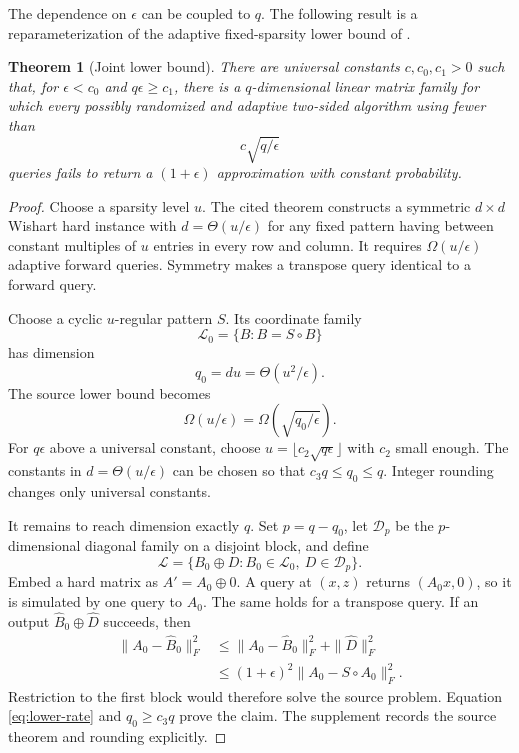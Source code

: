 \documentclass[twoside]{article}
\newtheorem{theorem}{Theorem}
\newcommand{\cL}{\mathcal L}
\begin{document}
The dependence on $\epsilon$ can be coupled to $q$. The following result is a reparameterization of the adaptive fixed-sparsity lower bound of \citet{amsel2026fixed}.

\begin{theorem}[Joint lower bound]
\label{thm:lower}
There are universal constants $c,c_0,c_1>0$ such that, for $\epsilon<c_0$ and $q\epsilon\ge c_1$, there is a $q$-dimensional linear matrix family for which every possibly randomized and adaptive two-sided algorithm using fewer than \[ c\sqrt{q/\epsilon} \] queries fails to return a $(1+\epsilon)$ approximation with constant probability.
\end{theorem}

\begin{proof}
Choose a sparsity level $u$. The cited theorem constructs a symmetric $d\times d$ Wishart hard instance with $d=\Theta(u/\epsilon)$ for any fixed pattern having between constant multiples of $u$ entries in every row and column. It requires $\Omega(u/\epsilon)$ adaptive forward queries. Symmetry makes a transpose query identical to a forward query.

Choose a cyclic $u$-regular pattern $S$. Its coordinate family \[ \cL_0=\{B:B=S\circ B\} \] has dimension
\begin{equation}
 q_0=du=\Theta(u^2/\epsilon).
 \label{eq:lower-q0}
\end{equation}
The source lower bound becomes
\begin{equation}
 \Omega(u/\epsilon)=\Omega(\sqrt{q_0/\epsilon}).
 \label{eq:lower-rate}
\end{equation}
For $q\epsilon$ above a universal constant, choose $u=\lfloor c_2\sqrt{q\epsilon}\rfloor$ with $c_2$ small enough. The constants in $d=\Theta(u/\epsilon)$ can be chosen so that $c_3q\le q_0\le q$. Integer rounding changes only universal constants.

It remains to reach dimension exactly $q$. Set $p=q-q_0$, let $\mathcal D_p$ be the $p$-dimensional diagonal family on a disjoint block, and define \[ \cL=\{B_0\oplus D:B_0\in\cL_0,\ D\in\mathcal D_p\}. \] Embed a hard matrix as $A'=A_0\oplus0$. A query at $(x,z)$ returns $(A_0x,0)$, so it is simulated by one query to $A_0$. The same holds for a transpose query. If an output $\widehat B_0\oplus\widehat D$ succeeds, then
\begin{align*}
 \|A_0-\widehat B_0\|_F^2
 &\le\|A_0-\widehat B_0\|_F^2+\|\widehat D\|_F^2\\
 &\le(1+\epsilon)^2\|A_0-S\circ A_0\|_F^2.
\end{align*}
Restriction to the first block would therefore solve the source problem. Equation \eqref{eq:lower-rate} and $q_0\ge c_3q$ prove the claim. The supplement records the source theorem and rounding explicitly.
\end{proof}
\end{document}
